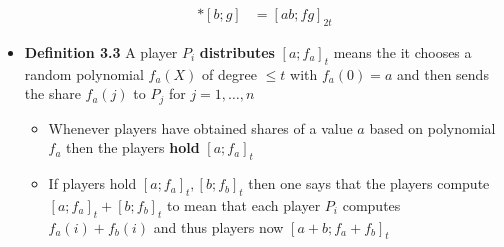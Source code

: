 \begin{itemize}
\begin{align*}
    [a;f] * [b;g] &= [ab;fg]_{2t}
  \end{align*}	
  \item \textbf{Definition 3.3} A player $P_i$ \textbf{distributes} $[a;f_a]_t$ means the it chooses a random polynomial $f_a(X)$ of degree $\leq t$ with $f_a(0) = a$ and then sends the share $f_a(j)$ to $P_j$ for $j=1,\dots,n$
  \begin{itemize}
  	\item Whenever players have obtained shares of a value $a$ based on polynomial $f_a$ then the players \textbf{hold} $[a;f_a]_t$
  	\item If players hold $[a;f_a]_t, [b;f_b]_t$ then one says that the players compute $[a;f_a]_t + [b;f_b]_t$ to mean that each player $P_i$ computes $f_a(i) + f_b(i)$ and thus players now  $[a+b;f_a + f_b]_t$
  \end{itemize}
\end{itemize}

